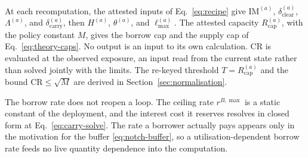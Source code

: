 At each recomputation, the attested inputs of Eq.~\eqref{eq:recipe} give $\mathrm{IM}^{(a)}$, $\delta_{\mathrm{clear}}^{(a)}$, $\Lambda^{(a)}$, and $\delta_{\mathrm{carry}}^{(a)}$, then $H^{(a)}$, $\theta^{(a)}$, and $\ell_{\max}^{(a)}$. The attested capacity $R_{\mathrm{cap}}^{(a)}$, with the policy constant $M$, gives the borrow cap and the supply cap of Eq.~\eqref{eq:theory-caps}. No output is an input to its own calculation. $\mathrm{CR}$ is evaluated at the observed exposure, an input read from the current state rather than solved jointly with the limits. The re-keyed threshold $T=R_{\mathrm{cap}}^{(a)}$ and the bound $\mathrm{CR}\le\sqrt{M}$ are derived in Section~\ref{sec:normalisation}.

The borrow rate does not reopen a loop. The ceiling rate $r^{B,\max}$ is a static constant of the deployment, and the interest cost it reserves resolves in closed form at Eq.~\eqref{eq:carry-solve}. The rate a borrower actually pays appears only in the motivation for the buffer \eqref{eq:notch-buffer}, so a utilisation-dependent borrow rate feeds no live quantity dependence into the computation.
